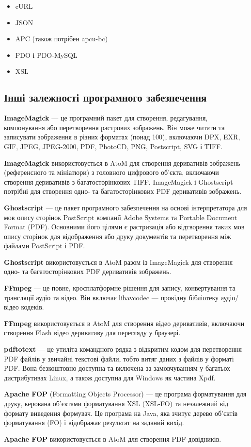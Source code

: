 \documentclass[14pt,a4paper]{article}
\begin{document}
\begin{large}
\begin{itemize}
    \item cURL
    \item JSON
    \item APC (також потрібен apcu-bc)
    \item PDO і PDO-MySQL
    \item XSL
\end{itemize}


\subsection{Інші залежності програмного забезпечення }

\textbf{ImageMagick} — це програмний пакет для створення, редагування, компонування або перетворення растрових зображень. Він може читати та записувати зображення в різних форматах (понад 100), включаючи DPX, EXR, GIF, JPEG, JPEG-2000, PDF, PhotoCD, PNG, Postscript, SVG і TIFF.

\textbf{ImageMagick} використовується в AtoM для створення деривативів зображень (референсного та мініатюри) з головного цифрового об’єкта, включаючи створення деривативів з багатосторінкових TIFF. ImageMagick і Ghostscript потрібні для створення одно- та багатосторінкових PDF деривативів зображень.

\textbf{Ghostscript} — це пакет програмного забезпечення на основі інтерпретатора для мов опису сторінок PostScript компанії Adobe Systems та Portable Document Format (PDF). Основними його цілями є растризація або відтворення таких мов опису сторінок для відображення або друку документів та перетворення між файлами PostScript і PDF.

\textbf{Ghostscript} використовується в AtoM разом із ImageMagick для створення одно- та багатосторінкових PDF деривативів зображень.

\textbf{FFmpeg} — це повне, кросплатформне рішення для запису, конвертування та трансляції аудіо та відео. Він включає libavcodec — провідну бібліотеку аудіо/відео кодеків.

\textbf{FFmpeg} використовується в AtoM для створення відео деривативів, включаючи створення Flash відео деривативу для перегляду у браузері.

\textbf{pdftotext} — це утиліта командного рядка з відкритим кодом для перетворення PDF файлів у звичайні текстові файли, тобто витяг даних з файлів у форматі PDF. Вона безкоштовно доступна та включена за замовчуванням у багатьох дистрибутивах Linux, а також доступна для Windows як частина Xpdf.

\textbf{Apache FOP} (Formatting Objects Processor) — це програма форматування для друку, керована об’єктами форматування XSL (XSL-FO) та незалежний від формату виведення формувач. Це програма на Java, яка зчитує дерево об'єктів форматування (FO) і відображає результат на заданий вихід.

\textbf{Apache FOP} використовується в AtoM для створення PDF-довідників.
\end{large}
\newpage
\end{document}
